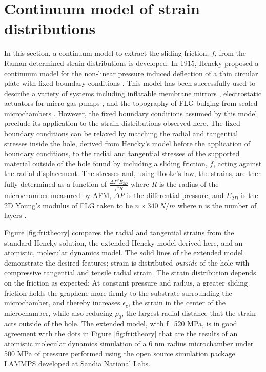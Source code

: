 \section{Continuum model of strain distributions \label{sec:fri:Continuum}}
In this section, a continuum model to extract the sliding friction, $f$, from the Raman determined strain distributions is developed.
In 1915, Hencky proposed a continuum model for the non-linear pressure induced deflection of a thin circular plate with fixed boundary conditions \cite{Hencky1915,Fichter1997}.
This model has been successfully used to describe a variety of systems including inflatable membrane mirrors \cite{Meinel2000}, electrostatic actuators for micro gas pumps \cite{Zhang2011b}, and the topography of FLG bulging from sealed microchambers \cite{Koenig2011}.
However, the fixed boundary conditions assumed by this model preclude its application to the strain distributions observed here.
The fixed boundary conditions can be relaxed by matching the radial and tangential stresses inside the hole, derived from Hencky's model before the application of boundary conditions, to the radial and tangential stresses of the supported material outside of the hole found by including a sliding friction, $f$, acting against the radial displacement.
The stresses and, using Hooke's law, the strains, are then fully determined as a function of $\frac{\Delta P^2 E_{2D}}{f^3 R}$ where $R$ is the radius of the microchamber measured by AFM, $\Delta P$ is the differential pressure, and $E_{2D}$ is the 2D Young's modulus of FLG taken to be $n \times 340 \ N/m$ where n is the number of layers \cite{Lee2008,Koenig2011}.

Figure \ref{fig:fri:theory} compares the radial and tangential strains from the standard Hencky solution, the extended Hencky model derived here, and an atomistic, molecular dynamics model.
The solid lines of the extended model demonstrate the desired features; strain is distributed \emph{outside} of the hole with compressive tangential and tensile radial strain.
The strain distribution depends on the friction as expected: At constant pressure and radius, a greater sliding friction holds the graphene more firmly to the substrate surrounding the microchamber, and thereby increases $\epsilon_c$, the strain in the center of the microchamber, while also reducing $\rho_0$, the largest radial distance that the strain acts outside of the hole.
The extended model, with f=520 MPa, is in good agreement with the dots in Figure \ref{fig:fri:theory} that are the results of an atomistic molecular dynamics simulation of a 6 nm radius microchamber under 500 MPa of pressure performed using the open source simulation package LAMMPS \cite{plimptonLAMMPS,PlimptonJCP1995} developed at Sandia National Labs.

